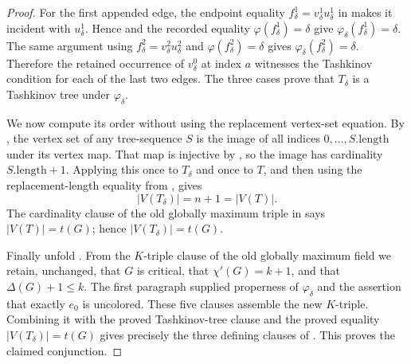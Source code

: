 \begin{proof}
For the first appended edge, the endpoint equality
$f^1_\delta=v^1_\delta u^1_\delta$ in
 makes it incident with
$u^1_\delta$.  Hence  and the
recorded equality $\varphi(f^1_\delta)=\delta$ give
$\varphi_\delta(f^1_\delta)=\delta$.  The same argument using
$f^2_\delta=v^2_\delta u^2_\delta$ and
$\varphi(f^2_\delta)=\delta$ gives
$\varphi_\delta(f^2_\delta)=\delta$.  Therefore the retained occurrence
of $v^0_\delta$ at index $a$ witnesses the Tashkinov condition for each
of the last two edges.  The three cases prove that $T_\delta$ is a
Tashkinov tree under $\varphi_\delta$.

We now compute its order without using the replacement vertex-set
equation.  By , the vertex set of any
tree-sequence $S$ is the image of all indices
$0,\ldots,S.\mathrm{length}$ under its vertex map.  That map is injective
by , so the image has cardinality
$S.\mathrm{length}+1$.  Applying this once to $T_\delta$ and once to $T$,
and then using the replacement-length equality from
, gives
\[
 |V(T_\delta)|=n+1=|V(T)|.
\]
The cardinality clause of the old globally maximum triple in
 says $|V(T)|=t(G)$; hence
$|V(T_\delta)|=t(G)$.

Finally unfold .  From the $K$-triple clause of the old
globally maximum field we retain, unchanged, that $G$ is critical, that
$\chi'(G)=k+1$, and that $\Delta(G)+1\leq k$.  The first paragraph supplied
properness of $\varphi_\delta$ and the assertion that exactly $e_0$ is
uncolored.  These five clauses assemble the new $K$-triple.  Combining it
with the proved Tashkinov-tree clause and the proved equality
$|V(T_\delta)|=t(G)$ gives precisely the three defining clauses of
.  This proves the claimed conjunction.
\end{proof}
